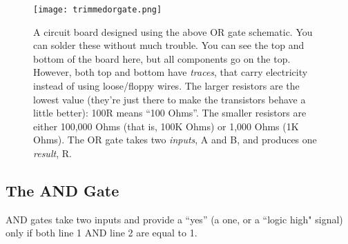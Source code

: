 \begin{figure}[h!]
\begin{center}
\texttt{[image: trimmedorgate.png]}
\caption{A circuit board designed using the above OR gate schematic. You can solder these without much trouble. You can see the top and bottom of the board here, but all components go on the top. However, both top and bottom have \emph{traces}, that carry electricity instead of using loose/floppy wires. The larger resistors are the lowest value (they're just there to make the transistors behave a little better): 100R means ``100 Ohms''. The smaller resistors are either 100,000 Ohms (that is, 100K Ohms) or 1,000 Ohms (1K Ohms). The OR gate takes two \emph{inputs}, A and B, and produces one \emph{result}, R.}
\label{fig:orgatepcbs}
\end{center}
\end{figure}





\clearpage
\newpage

\subsection*{The AND Gate}

AND gates take two inputs and provide a ``yes'' (a one, or a ``logic high" signal) only if both line 1 AND line 2 are equal to 1.


